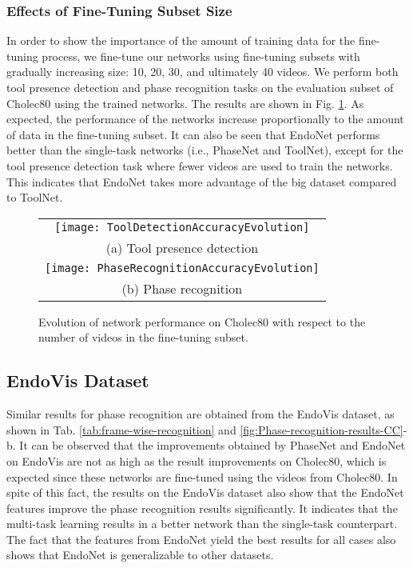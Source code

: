 \documentclass[journal]{IEEEtran} \usepackage{amssymb}
\begin{document}
\subsubsection{\textbf{Effects of Fine-Tuning Subset Size} \label{subsect:effect-of-fine-tuning-size}}

In order to show the importance of the amount of training data for the fine-tuning process, we fine-tune our networks using fine-tuning subsets with gradually increasing size: 10, 20, 30, and ultimately 40 videos. We perform both tool presence detection and phase recognition tasks on the evaluation subset of Cholec80 using the trained networks. The results are shown in Fig. \ref{fig:evolution-of-accuracy}. As expected, the performance of the networks increase proportionally to the amount of data in the fine-tuning subset. It can also be seen that EndoNet performs better than the single-task networks (i.e., PhaseNet and ToolNet), except for the tool presence detection task where fewer videos are used to train the networks. This indicates that EndoNet takes more advantage of the big dataset compared to ToolNet.

\begin{figure}
\begin{centering}
\begin{tabular}{c}
\texttt{[image: ToolDetectionAccuracyEvolution]}\tabularnewline
{\footnotesize (a) Tool presence detection}\tabularnewline
\texttt{[image: PhaseRecognitionAccuracyEvolution]}\tabularnewline
{\footnotesize (b) Phase recognition}\tabularnewline
\end{tabular}
\par\end{centering}

\caption{Evolution of network performance on Cholec80 with respect to the number of videos in the
fine-tuning subset. \label{fig:evolution-of-accuracy}}
\end{figure}


\subsection{EndoVis Dataset}

Similar results for phase recognition are obtained from the EndoVis
dataset, as shown in Tab. \ref{tab:frame-wise-recognition} and \ref{fig:Phase-recognition-results-CC}-b. It can be observed that the improvements obtained by
PhaseNet and EndoNet on EndoVis are not as high as the result improvements on Cholec80, 
which is expected since these networks are fine-tuned using the videos from Cholec80. 
In spite of this fact, the results on the EndoVis dataset also show that the EndoNet features
improve the phase recognition results significantly. It indicates that 
the multi-task learning results in a better network than the single-task 
counterpart. The fact that the features from EndoNet yield the best results for 
all cases also shows that EndoNet is generalizable to other datasets. 
\end{document}
